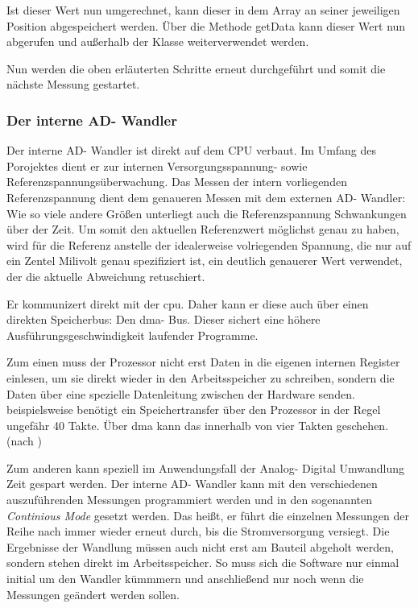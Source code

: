 Ist dieser Wert nun umgerechnet, kann dieser in dem Array an seiner jeweiligen Position abgespeichert werden.
Über die Methode getData kann dieser Wert nun abgerufen und außerhalb der Klasse weiterverwendet werden.

Nun werden die oben erläuterten Schritte erneut durchgeführt und somit die nächste Messung gestartet.

\subsubsection{Der interne AD- Wandler}
\label{subsubsec:internal-adc-software}

Der interne AD- Wandler ist direkt auf dem CPU verbaut.
Im Umfang des Porojektes dient er zur internen Versorgungsspannung- sowie Referenzspannungsüberwachung.
Das Messen der intern vorliegenden Referenzspannung dient dem genaueren Messen mit dem externen AD- Wandler: Wie so viele andere Größen unterliegt auch die Referenzspannung Schwankungen über der Zeit.
Um somit den aktuellen Referenzwert möglichst genau zu haben, wird für die Referenz anstelle der idealerweise volriegenden Spannung, die nur auf ein Zentel Milivolt genau spezifiziert ist, ein deutlich genauerer Wert verwendet, der die aktuelle Abweichung retuschiert.

Er kommunizert direkt mit der \ac{cpu}.
Daher kann er diese auch über einen direkten Speicherbus: Den \ac{dma}- Bus.
Dieser sichert eine höhere Ausführungsgeschwindigkeit laufender Programme.

Zum einen muss der Prozessor nicht erst Daten in die eigenen internen Register einlesen, um sie direkt wieder in den Arbeitsspeicher zu schreiben, sondern die Daten über eine spezielle Datenleitung zwischen der Hardware senden.
beispielsweise benötigt ein Speichertransfer über den Prozessor in der Regel ungefähr 40 Takte.
Über \ac{dma} kann das innerhalb von vier Takten geschehen. (nach \textcite[][]{ElektronikKompendium.DMA})

Zum anderen kann speziell im Anwendungsfall der Analog- Digital Umwandlung Zeit gespart werden.
Der interne AD- Wandler kann mit den verschiedenen auszuführenden Messungen programmiert werden und in den sogenannten \textit{Continious Mode} gesetzt werden.\newline
Das heißt, er führt die einzelnen Messungen der Reihe nach immer wieder erneut durch, bis die Stromversorgung versiegt.
Die Ergebnisse der Wandlung müssen auch nicht erst am Bauteil abgeholt werden, sondern stehen direkt im Arbeitsspeicher.
So muss sich die Software nur einmal initial um den Wandler kümmmern und anschließend nur noch wenn die Messungen geändert werden sollen.

